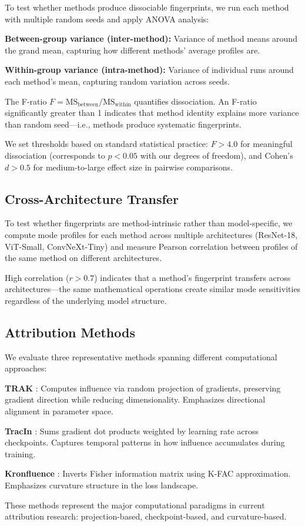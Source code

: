 To test whether methods produce dissociable fingerprints, we run each method with multiple random seeds and apply ANOVA analysis:

\textbf{Between-group variance (inter-method):} Variance of method means around the grand mean, capturing how different methods' average profiles are.

\textbf{Within-group variance (intra-method):} Variance of individual runs around each method's mean, capturing random variation across seeds.

The F-ratio $F = \text{MS}_\text{between} / \text{MS}_\text{within}$ quantifies dissociation. An F-ratio significantly greater than 1 indicates that method identity explains more variance than random seed---i.e., methods produce systematic fingerprints.

We set thresholds based on standard statistical practice: $F > 4.0$ for meaningful dissociation (corresponds to $p < 0.05$ with our degrees of freedom), and Cohen's $d > 0.5$ for medium-to-large effect size in pairwise comparisons.

\subsection{Cross-Architecture Transfer}

To test whether fingerprints are method-intrinsic rather than model-specific, we compute mode profiles for each method across multiple architectures (ResNet-18, ViT-Small, ConvNeXt-Tiny) and measure Pearson correlation between profiles of the same method on different architectures.

High correlation ($r > 0.7$) indicates that a method's fingerprint transfers across architectures---the same mathematical operations create similar mode sensitivities regardless of the underlying model structure.

\subsection{Attribution Methods}

We evaluate three representative methods spanning different computational approaches:

\textbf{TRAK} \cite{park2023trak}: Computes influence via random projection of gradients, preserving gradient direction while reducing dimensionality. Emphasizes directional alignment in parameter space.

\textbf{TracIn} \cite{pruthi2020estimating}: Sums gradient dot products weighted by learning rate across checkpoints. Captures temporal patterns in how influence accumulates during training.

\textbf{Kronfluence} \cite{grosse2023studying}: Inverts Fisher information matrix using K-FAC approximation. Emphasizes curvature structure in the loss landscape.

These methods represent the major computational paradigms in current attribution research: projection-based, checkpoint-based, and curvature-based.
